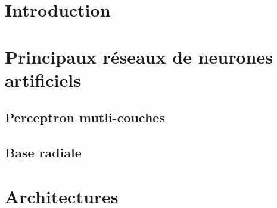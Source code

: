 \documentclass[12pt,a4paper,oneside, titlepage]{article}
\begin{document}


\tableofcontents
\section{Introduction}
\section{Principaux réseaux de neurones artificiels}
\subsection{Perceptron mutli-couches}
\subsection{Base radiale}
\section{Architectures}
\end{document}
